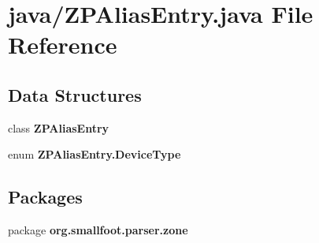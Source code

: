 \section{java/\+Z\+P\+Alias\+Entry.java File Reference}
\label{ZPAliasEntry_8java}
\subsection*{Data Structures}
\begin{DoxyCompactItemize}
\item 
class {\bf Z\+P\+Alias\+Entry}
\item 
enum {\bf Z\+P\+Alias\+Entry.\+Device\+Type}
\end{DoxyCompactItemize}
\subsection*{Packages}
\begin{DoxyCompactItemize}
\item 
package {\bf org.\+smallfoot.\+parser.\+zone}
\end{DoxyCompactItemize}
